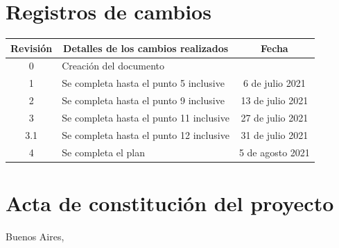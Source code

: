 \documentclass[
11pt, %
codirector, %
]{charter}
\begin{document}
\maketitle
\thispagestyle{empty}
\pagebreak


\thispagestyle{empty}
{\setlength{\parskip}{0pt}
	\tableofcontents{}
}
\pagebreak


\section*{Registros de cambios}
\label{sec:registro}


\begin{table}[ht]
	\label{tab:registro}
	\centering
	\begin{tabularx}{\linewidth}{@{}|c|X|c|@{}}
		\hline
		\rowcolor[HTML]{C0C0C0}
		Revisión & \multicolumn{1}{c|}{\cellcolor[HTML]{C0C0C0}Detalles de los cambios realizados} & Fecha            \\ \hline
		0        & Creación del documento                                                          & \fechaInicioName \\ \hline
		1        & Se completa hasta el punto 5 inclusive                                          & 6 de julio 2021  \\ \hline
		2        & Se completa hasta el punto 9 inclusive                                          & 13 de julio 2021 \\ \hline
		3        & Se completa hasta el punto 11 inclusive                                         & 27 de julio 2021 \\ \hline
		3.1      & Se completa hasta el punto 12 inclusive                                         & 31 de julio 2021 \\ \hline
		4        & Se completa el plan                                                             & 5 de agosto 2021 \\ \hline
	\end{tabularx}
\end{table}

\pagebreak



\section*{Acta de constitución del proyecto}
\label{sec:acta}

\begin{flushright}
	Buenos Aires, \fechaInicioName
\end{flushright}
\end{document}
